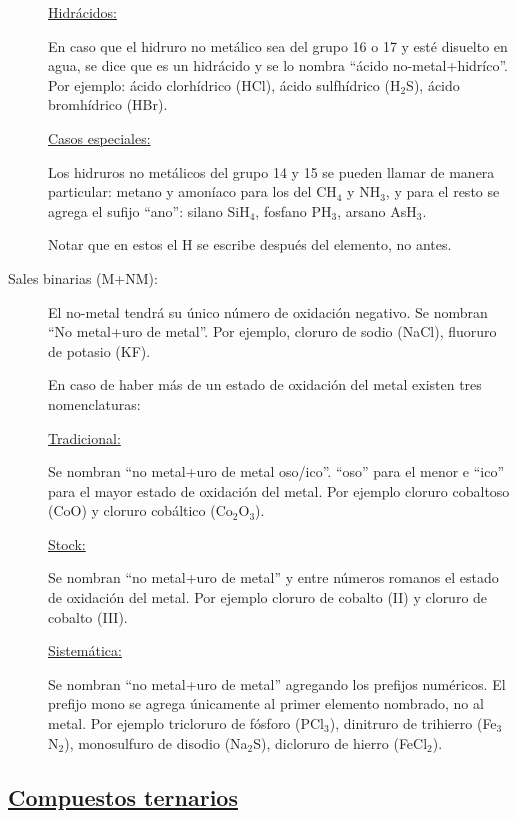 \begin{description}
\underline{Hidrácidos:}

En caso que el hidruro no metálico sea del grupo 16 o 17 y esté disuelto en agua, se dice que es un hidrácido y se lo nombra ``ácido no-metal+hidríco''. Por ejemplo: ácido clorhídrico (HCl), ácido sulfhídrico (H$_2$S), ácido bromhídrico (HBr).

\underline{Casos especiales:}

Los hidruros no metálicos del grupo 14 y 15 se pueden llamar de manera particular: metano y amoníaco para los del CH$_4$ y NH$_3$, y para el resto se agrega el sufijo ``ano'': silano SiH$_4$, fosfano PH$_3$, arsano AsH$_3$.


Notar que en estos el H se escribe después del elemento, no antes.



\item[Sales binarias (M+NM):]\hfil

El no-metal tendrá su único número de oxidación negativo. Se nombran ``No metal+uro de metal''. Por ejemplo, cloruro de sodio (NaCl), fluoruro de potasio (KF).

En caso de haber más de un estado de oxidación del metal existen tres nomenclaturas:

\underline{Tradicional:}

Se nombran ``no metal+uro de metal oso/ico''. ``oso'' para el menor e ``ico'' para el mayor estado de oxidación del metal. Por ejemplo cloruro cobaltoso (CoO) y cloruro cobáltico (Co$_2$O$_3$).

\underline{Stock:}

Se nombran ``no metal+uro de metal'' y entre números romanos el estado de oxidación del metal. Por ejemplo cloruro de cobalto (II) y cloruro de cobalto (III).

\underline{Sistemática:}

Se nombran ``no metal+uro de metal'' agregando los prefijos numéricos. El prefijo mono se agrega únicamente al primer elemento nombrado, no al metal. Por ejemplo tricloruro de fósforo (PCl$_3$), dinitruro de trihierro (Fe$_3$N$_2$), monosulfuro de disodio (Na$_2$S), dicloruro de hierro (FeCl$_2$).
\end{description}





\newpage
\subsection*{\underline{Compuestos ternarios}}

